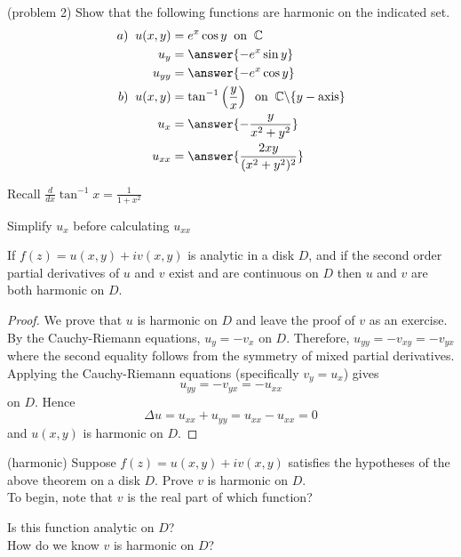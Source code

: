 \documentclass[handout]{ximera}
\begin{document}
\begin{problem}(problem 2)
Show that the following functions are harmonic on the indicated set.\\
\begin{align*}
a) \;\; u(x,y) &= e^x\cos y \;\;\text{on} \;\; \C\\
u_y &= \answer{-e^x \sin y}\\
u_{yy} &= \answer{-e^x \cos y}\\
b) \;\; u(x,y) &= \tan^{-1}\left(\frac{y}{x}\right) \;\; \text{on} \;\; \C\backslash \{y-\text{axis}\}\\
u_x &= \answer{-\frac{y}{x^2+y^2}}\\
u_{xx} &= \answer{\frac{2xy}{(x^2+y^2)^2}}
\end{align*}
\begin{hint}
Recall $\frac{d}{dx} \tan^{-1} x = \frac{1}{1+x^2}$
\end{hint}
\begin{hint}
Simplify $u_x$ before calculating $u_{xx}$
\end{hint}



\end{problem}


\begin{theorem}
If $f(z) = u(x,y) + iv(x,y)$ is analytic in a disk $D$, and if the second order 
partial derivatives of $u$ and $v$ exist and are continuous on $D$ then $u$ and $v$ are both harmonic on $D$.
\end{theorem}
\begin{proof}
We prove that $u$ is harmonic on $D$ and leave the proof of $v$ as an exercise.\\
By the Cauchy-Riemann equations, $u_y = -v_x$ on $D$.  Therefore, $u_{yy} = -v_{xy} = -v_{yx}$ where the 
second equality follows from the symmetry of mixed partial derivatives. Applying the Cauchy-Riemann 
equations (specifically $v_y = u_x$)  gives
\[
u_{yy} = -v_{yx} = -u_{xx}
\]
on $D$. Hence
\[
\Delta u = u_{xx} + u_{yy} = u_{xx} - u_{xx} = 0
\]
and $u(x,y)$ is harmonic on $D$.
\end{proof}

\begin{problem}(harmonic)
Suppose $f(z) = u(x,y) + iv(x,y)$ satisfies the hypotheses of the above theorem on a disk $D$. 
Prove $v$ is harmonic on $D$.\\
To begin, note that $v$ is the real part of which function?
\begin{multipleChoice}
\end{multipleChoice}
Is this function analytic on $D$? \\
How do we know $v$ is harmonic on $D$? 
\end{problem}
  
\end{document}
